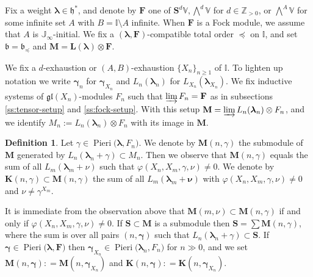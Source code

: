 \documentclass[11pt,fleqn]{amsart}
\newcommand\ZZ{\mathbb Z}
\newcommand\II{\mathbb I}
\newcommand\JJ{\mathbb J}
\renewcommand\phi{\varphi}
\theoremstyle{definition}
\newtheorem{defn}[thm]{Definition}
\theoremstyle{remark}
\theoremstyle{remark}
\newcommand\VV{\mathbb V}
\newcommand\gl{\mathfrak{gl}}
\renewcommand\SS{\mathbf S}
\newcommand\lie[1]{\mathfrak{#1}}
\newcommand\wt[1]{\boldsymbol{#1}}
\newcommand\Pieri[2]{\operatorname{Pieri}{(#1},{#2)}}
\newcommand\map[4]{\phi(#3,#4,#1,#2)}
\begin{document}
Fix a weight $\wt\lambda \in \lie h^*$, and denote by $\mathbf F$ 
one of $\SS^d\VV, \bigwedge^d \VV$ for $d \in \ZZ_{>0}$, or $\bigwedge^A \VV$ 
for some infinite set $A$ with $B = \II \setminus A$ infinite. When $\mathbf 
F$ is a Fock module, we assume that $A$ is $\JJ_\infty$-initial. We fix a 
$(\wt\lambda, \mathbf F)$-compatible total order $\preceq$ on $\II$, and set 
$\lie b = \lie b_{\preceq}$ and $\mathbf M = \mathbf L(\wt\lambda) \otimes 
\mathbf F$. 

We fix a $d$-exhaustion or $(A,B)$-exhaustion $\{X_n\}_{n \geq 1}$ of $\II$. To 
lighten up notation we write $\wt\gamma_n$ for $\wt\gamma_{X_n}$ and 
$L_n(\wt\lambda_n)$ for $L_{X_n}(\wt\lambda_{X_n})$. We fix inductive systems 
of $\gl(X_n)$-modules $F_n$ such that $\varinjlim F_n = \mathbf F$ as in 
subsections \ref{ss:tensor-setup} and \ref{ss:fock-setup}. With this setup 
$\mathbf M = \varinjlim L_n(\wt\lambda_n) \otimes F_n$, and we identify $M_n 
:= L_n(\wt\lambda_n) \otimes F_n$ with its image in $\mathbf M$.

\begin{defn}
Let $\gamma \in \Pieri{\wt\lambda}{F_n}$. We denote by $\mathbf M(n, \gamma)$ 
the submodule of $\mathbf M$ generated by $L_n(\wt\lambda_n + \gamma) \subset 
M_n$. Then we observe that 
$\mathbf M(n,\gamma)$ equals the sum of all $L_m(\wt\lambda_m+\nu)$ such that 
$\map{\gamma}{\nu}{X_n}{X_m} \neq 0$. We denote by $\mathbf K(n,\gamma) 
\subset \mathbf M(n,\gamma)$ the sum of all $L_m(\wt\lambda_m + \wt\nu)$ with 
$\map{\gamma}{\nu}{X_n}{X_m} \neq 0$ and $\nu \neq \gamma^{X_m}$.
\end{defn}

It is immediate from the observation above that $\mathbf M(m,\nu) \subset 
\mathbf M(n,\gamma)$ if and only if $\map{\gamma}{\nu}{X_n}{X_m} \neq 0$. If 
$\mathbf 
S \subset \mathbf M$ is a submodule then $\mathbf S = \sum \mathbf 
M(n,\gamma)$, where the sum is over all pairs $(n,\wt\gamma)$ such that 
$L_n(\wt\lambda_n + \gamma) \subset \mathbf S$.  If $\wt\gamma \in 
\Pieri{\wt\lambda}{\mathbf F}$ then $\wt\gamma_{X_n} \in \Pieri{\wt\lambda_n}
{F_n}$ for $n \gg 0$, and we set $\mathbf M(n,\wt\gamma): = \mathbf M(n,
\wt\gamma_{X_n})$ and $\mathbf K(n,\wt\gamma): = \mathbf K(n,\wt\gamma_{X_n})$.
\end{document}
